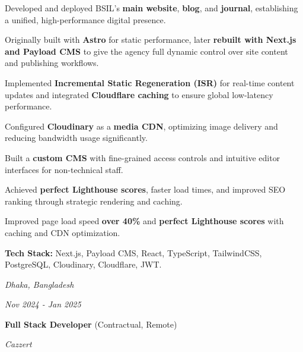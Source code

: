     \vspace{0.10 cm}
    \begin{onecolentry}
        \begin{highlights}
            \item Developed and deployed BSIL’s \textbf{main website}, \textbf{blog}, and \textbf{journal}, establishing a unified, high-performance digital presence.
            \item Originally built with \textbf{Astro} for static performance, later \textbf{rebuilt with Next.js and Payload CMS} to give the agency full dynamic control over site content and publishing workflows.
            \item Implemented \textbf{Incremental Static Regeneration (ISR)} for real-time content updates and integrated \textbf{Cloudflare caching} to ensure global low-latency performance.
            \item Configured \textbf{Cloudinary} as a \textbf{media CDN}, optimizing image delivery and reducing bandwidth usage significantly.
            \item Built a \textbf{custom CMS} with fine-grained access controls and intuitive editor interfaces for non-technical staff.
            \item Achieved \textbf{perfect Lighthouse scores}, faster load times, and improved SEO ranking through strategic rendering and caching.
            \item Improved page load speed \textbf{over 40\%} and \textbf{perfect Lighthouse scores} with caching and CDN optimization.
            \item  \textbf{Tech Stack:} Next.js, Payload CMS, React, TypeScript, TailwindCSS, PostgreSQL, Cloudinary, Cloudflare, JWT.
        \end{highlights}
    \end{onecolentry}


    \vspace{0.2 cm}

    \begin{twocolentry}{
    \textit{Dhaka, Bangladesh}
        
    \textit{Nov 2024 - Jan 2025}}
        \textbf{Full Stack Developer} (Contractual, Remote)
        
        \textit{Cazzert}
    \end{twocolentry}

